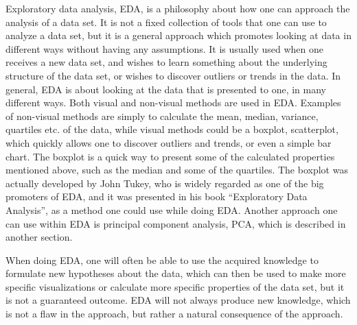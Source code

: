 \documentclass[Report.tex]{subfiles}
\begin{document}
Exploratory data analysis, EDA, is a philosophy about how one can approach the analysis of a data set.
It is not a fixed collection of tools that one can use to analyze a data set, but it is a general
approach which promotes looking at data in different ways without having any assumptions. It is usually
used when one receives a new data set, and wishes to learn something about the underlying structure of the
data set, or wishes to discover outliers or trends in the data. In general, EDA is about looking at
the data that is presented to one, in many different ways. Both visual and non-visual methods are used
in EDA. Examples of non-visual methods are simply to calculate the mean, median, variance, quartiles etc. of
the data, while visual methods could be a boxplot, scatterplot, which quickly allows one to discover outliers and trends, or even a simple
bar chart. The boxplot is a quick way to present some of the calculated properties mentioned above, such as the median and some of the 
quartiles. The boxplot was actually developed by John Tukey, who is widely regarded as one of the big promoters of EDA, and
it was presented in his book ``Exploratory Data Analysis'', as a method one could use while doing EDA.
Another approach one can use within EDA is principal component analysis, PCA, which is described in another section.

When doing EDA, one will often be able to use the acquired knowledge to formulate new hypotheses about the data, which can then
be used to make more specific visualizations or calculate more specific properties of the data set, but it
is not a guaranteed outcome. EDA will not always produce new knowledge, which is not a flaw in the approach,
but rather a natural consequence of the approach.

\end{document}
